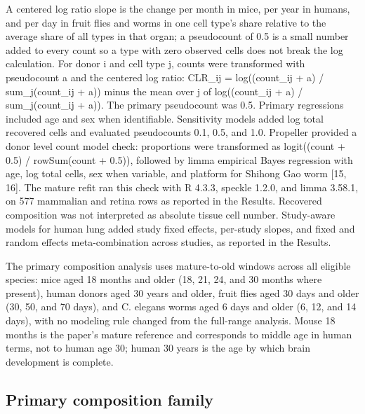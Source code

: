 \documentclass[11pt]{article}
\begin{document}
A centered log ratio slope is the change per month in mice, per year in humans, and per day in fruit flies and worms in one cell type's share relative to the average share of all types in that organ; a pseudocount of 0.5 is a small number added to every count so a type with zero observed cells does not break the log calculation. For donor i and cell type j, counts were transformed with pseudocount a and the centered log ratio: CLR\_ij = log((count\_ij + a) / sum\_j(count\_ij + a)) minus the mean over j of log((count\_ij + a) / sum\_j(count\_ij + a)). The primary pseudocount was 0.5. Primary regressions included age and sex when identifiable. Sensitivity models added log total recovered cells and evaluated pseudocounts 0.1, 0.5, and 1.0. Propeller provided a donor level count model check: proportions were transformed as logit((count + 0.5) / rowSum(count + 0.5)), followed by limma empirical Bayes regression with age, log total cells, sex when variable, and platform for Shihong Gao worm [15, 16]. The mature refit ran this check with R 4.3.3, speckle 1.2.0, and limma 3.58.1, on 577 mammalian and retina rows as reported in the Results. Recovered composition was not interpreted as absolute tissue cell number. Study-aware models for human lung added study fixed effects, per-study slopes, and fixed and random effects meta-combination across studies, as reported in the Results.

The primary composition analysis uses mature-to-old windows across all eligible species: mice aged 18 months and older (18, 21, 24, and 30 months where present), human donors aged 30 years and older, fruit flies aged 30 days and older (30, 50, and 70 days), and C. elegans worms aged 6 days and older (6, 12, and 14 days), with no modeling rule changed from the full-range analysis. Mouse 18 months is the paper's mature reference and corresponds to middle age in human terms, not to human age 30; human 30 years is the age by which brain development is complete.

\subsection*{Primary composition family}
\end{document}
